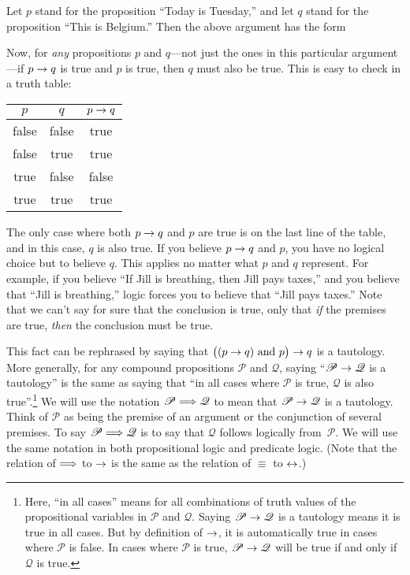 Let $p$ stand for the proposition ``Today is Tuesday,'' and let $q$ stand for the
proposition ``This is Belgium.''  Then the above argument has the form
\begin{center}
\end{center}
Now, for \emph{any} propositions $p$ and $q$---not just the ones in this particular
argument---if $p\rightarrow q$ is true and $p$ is true, then $q$ must also be true.
This is easy to check in a truth table:
\begin{center}
  \begin{tabular}{|c|c|c|}
     \hline
     \strut $p$&    $q$&    $p\rightarrow q$\\
     \hline
     false&  false&  true\\
     false&  true&   true\\
     true&   false&  false\\
     true&   true&   true\\
     \hline
  \end{tabular}
\end{center}
The only case where both $p\rightarrow q$ and $p$ are true is on
the last line of the table, and in this case, $q$ is also true.
If you believe
$p\rightarrow q$ and $p$, you have no logical choice but to believe $q$.
This applies no matter what $p$ and $q$ represent.  For example,
if you believe ``If Jill is breathing, then Jill pays taxes,'' 
and you believe that ``Jill is breathing,'' logic forces you to believe that
``Jill pays taxes.''  Note that we can't say for sure that the
conclusion is true, only that \emph{if} the premises are true,
\emph{then} the conclusion must be true.

This fact can be rephrased by saying that $\big((p\rightarrow q)\text{ and } p\big)\rightarrow q$
is a tautology.  More generally, for any compound propositions $\mathscr{P}$
and $\mathscr{Q}$, saying ``$\mathscr{P}\rightarrow \mathscr{Q}$ is
a tautology'' is the same as saying that ``in all cases where $\mathscr{P}$
is true, $\mathscr{Q}$ is also true''.\footnote{Here, ``in all cases'' means
for all combinations of truth values of the propositional variables
in $\mathscr{P}$ and $\mathscr{Q}$.  Saying $\mathscr{P}\rightarrow \mathscr{Q}$ is
a tautology means it is true in all cases.  But by definition of 
$\rightarrow$, it is automatically true in cases where $\mathscr{P}$ is
false.  In cases where $\mathscr{P}$ is true, $\mathscr{P}\rightarrow \mathscr{Q}$
will be true if and only if $\mathscr{Q}$ is true.}
We will use the notation $\mathscr{P}\Longrightarrow\mathscr{Q}$ to
mean that $\mathscr{P}\rightarrow \mathscr{Q}$ is a tautology.
Think of $\mathscr{P}$ as being the premise of an argument or
the conjunction of several premises.  To say $\mathscr{P}\Longrightarrow\mathscr{Q}$
is to say that $\mathscr{Q}$ follows logically from~$\mathscr{P}$.
We will use the same notation in both propositional logic and
predicate logic.  (Note that the relation of $\Longrightarrow$ to $\rightarrow$ is
the same as the relation of $\equiv$ to $\leftrightarrow$.)


